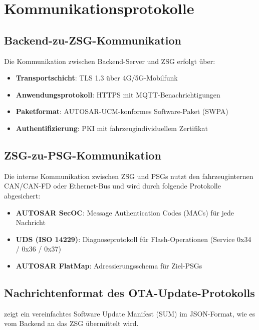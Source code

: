 ﻿\documentclass[12pt,a4paper,twoside]{article}
\begin{document}
\section{Kommunikationsprotokolle}
\label{sec:protokolle}


\subsection{Backend-zu-ZSG-Kommunikation}

Die Kommunikation zwischen Backend-Server und ZSG erfolgt über:

\begin{itemize}
  \item \textbf{Transportschicht}: TLS 1.3 über 4G/5G-Mobilfunk
  \item \textbf{Anwendungsprotokoll}: HTTPS mit MQTT-Benachrichtigungen
  \item \textbf{Paketformat}: AUTOSAR-UCM-konformes Software-Paket (SWPA)
  \item \textbf{Authentifizierung}: PKI mit fahrzeugindividuellem Zertifikat
\end{itemize}

\subsection{ZSG-zu-PSG-Kommunikation}

Die interne Kommunikation zwischen ZSG und PSGs nutzt den fahrzeuginternen
CAN/CAN-FD oder Ethernet-Bus und wird durch folgende Protokolle abgesichert:

\begin{itemize}
  \item \textbf{AUTOSAR SecOC}: Message Authentication Codes (MACs) für
    jede Nachricht
  \item \textbf{UDS (ISO 14229)}: Diagnoseprotokoll für Flash-Operationen
    (Service 0x34 / 0x36 / 0x37)
  \item \textbf{AUTOSAR FlatMap}: Adressierungsschema für Ziel-PSGs
\end{itemize}

\subsection{Nachrichtenformat des OTA-Update-Protokolls}

 zeigt ein vereinfachtes Software Update Manifest (SUM)
im JSON-Format, wie es vom Backend an das ZSG übermittelt wird.
\end{document}
